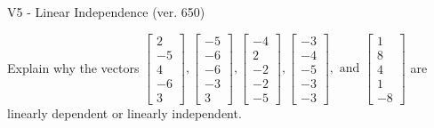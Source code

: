 \begin{exercise}
  \begin{exerciseTitle}V5 - Linear Independence (ver. 650)\end{exerciseTitle}
  \begin{exerciseStatement}
    Explain why the vectors \(\left[\begin{array}{r}
2 \\
-5 \\
4 \\
-6 \\
3
\end{array}\right] , \left[\begin{array}{r}
-5 \\
-6 \\
-6 \\
-3 \\
3
\end{array}\right] , \left[\begin{array}{r}
-4 \\
2 \\
-2 \\
-2 \\
-5
\end{array}\right] , \left[\begin{array}{r}
-3 \\
-4 \\
-5 \\
-3 \\
-3
\end{array}\right] , \text{ and } \left[\begin{array}{r}
1 \\
8 \\
4 \\
1 \\
-8
\end{array}\right]\) are linearly dependent or linearly independent.	



\end{exerciseStatement}
\end{exercise}
